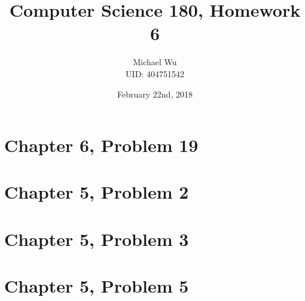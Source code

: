 \documentclass[12pt]{article}
\begin{document}
\title{Computer Science 180, Homework 6}
\date{February 22nd, 2018}
\author{Michael Wu\\UID: 404751542}
\maketitle

\section*{Chapter 6, Problem 19}

\pagebreak

\section*{Chapter 5, Problem 2}

\pagebreak

\section*{Chapter 5, Problem 3}

\pagebreak

\section*{Chapter 5, Problem 5}

\pagebreak
\end{document}
